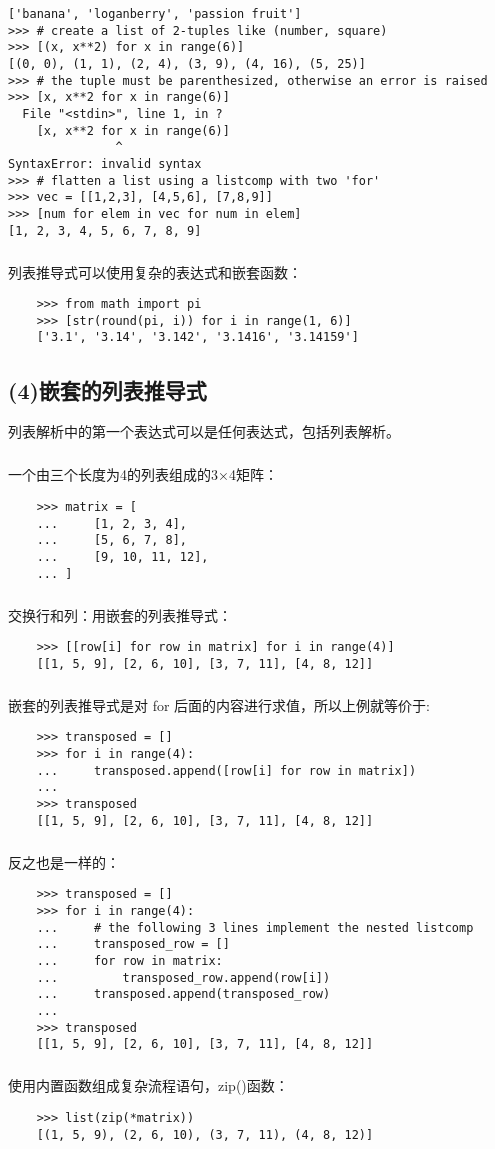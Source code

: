 \documentclass{article}
\begin{document}
\begin{CJK}{UTF8}{gbsn}
\begin{verbatim}
['banana', 'loganberry', 'passion fruit']
>>> # create a list of 2-tuples like (number, square)
>>> [(x, x**2) for x in range(6)]
[(0, 0), (1, 1), (2, 4), (3, 9), (4, 16), (5, 25)]
>>> # the tuple must be parenthesized, otherwise an error is raised
>>> [x, x**2 for x in range(6)]
  File "<stdin>", line 1, in ?
    [x, x**2 for x in range(6)]
               ^
SyntaxError: invalid syntax
>>> # flatten a list using a listcomp with two 'for'
>>> vec = [[1,2,3], [4,5,6], [7,8,9]]
>>> [num for elem in vec for num in elem]
[1, 2, 3, 4, 5, 6, 7, 8, 9]
\end{verbatim}
\subparagraph*{}
列表推导式可以使用复杂的表达式和嵌套函数：
    \begin{verbatim}
    >>> from math import pi
    >>> [str(round(pi, i)) for i in range(1, 6)]
    ['3.1', '3.14', '3.142', '3.1416', '3.14159']
    \end{verbatim}
\subsection*{(4)嵌套的列表推导式}
列表解析中的第一个表达式可以是任何表达式，包括列表解析。
\subparagraph*{}
一个由三个长度为4的列表组成的3×4矩阵：
    \begin{verbatim}
    >>> matrix = [
    ...     [1, 2, 3, 4],
    ...     [5, 6, 7, 8],
    ...     [9, 10, 11, 12],
    ... ]
    \end{verbatim}
\subparagraph*{}
交换行和列：用嵌套的列表推导式：
    \begin{verbatim}
    >>> [[row[i] for row in matrix] for i in range(4)]
    [[1, 5, 9], [2, 6, 10], [3, 7, 11], [4, 8, 12]]
    \end{verbatim}
\subparagraph*{}
嵌套的列表推导式是对 for 后面的内容进行求值，所以上例就等价于:
    \begin{verbatim}
    >>> transposed = []
    >>> for i in range(4):
    ...     transposed.append([row[i] for row in matrix])
    ...
    >>> transposed
    [[1, 5, 9], [2, 6, 10], [3, 7, 11], [4, 8, 12]]
\end{verbatim}
\subparagraph*{}
反之也是一样的：
    \begin{verbatim}
    >>> transposed = []
    >>> for i in range(4):
    ...     # the following 3 lines implement the nested listcomp
    ...     transposed_row = []
    ...     for row in matrix:
    ...         transposed_row.append(row[i])
    ...     transposed.append(transposed_row)
    ...
    >>> transposed
    [[1, 5, 9], [2, 6, 10], [3, 7, 11], [4, 8, 12]]
\end{verbatim}
\subparagraph*{}
使用内置函数组成复杂流程语句，zip()函数：
   \begin{verbatim}
    >>> list(zip(*matrix))
    [(1, 5, 9), (2, 6, 10), (3, 7, 11), (4, 8, 12)]
   \end{verbatim}

\end{CJK}
\end{document}
